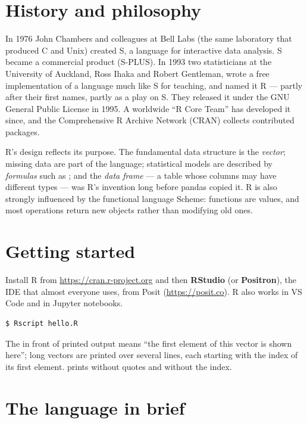 \section{History and philosophy}

\begin{history}
In 1976 John Chambers and colleagues at Bell Labs (the same laboratory that produced C
and Unix) created S, a language for interactive data analysis. S became a commercial
product (S-PLUS). In 1993 two statisticians at the University of Auckland, Ross Ihaka
and Robert Gentleman, wrote a free implementation of a language much like S for teaching,
and named it R --- partly after their first names, partly as a play on S. They released it
under the GNU General Public License in 1995. A worldwide ``R Core Team'' has developed it
since, and the Comprehensive R Archive Network (CRAN) collects contributed packages.
\end{history}

R's design reflects its purpose. The fundamental data structure is the \emph{vector};
missing data are part of the language; statistical models are described by
\emph{formulas} such as ; and the \emph{data frame} --- a table
whose columns may have different types --- was R's invention long before pandas copied it.
R is also strongly influenced by the functional language Scheme: functions are values,
and most operations return new objects rather than modifying old ones.

\section{Getting started}

Install R from \url{https://cran.r-project.org} and then \textbf{RStudio} (or
\textbf{Positron}), the IDE that almost everyone uses, from Posit
(\url{https://posit.co}). R also works in VS Code and in Jupyter notebooks.
\begin{lstlisting}[style=shell]
$ Rscript hello.R
\end{lstlisting}
The \code{[1]} in front of printed output means ``the first element of this vector is
shown here''; long vectors are printed over several lines, each starting with the index of
its first element.  prints without quotes and without the index.

\section{The language in brief}

